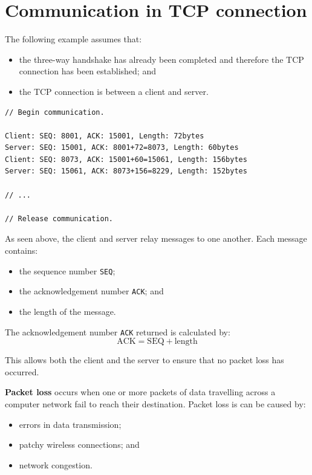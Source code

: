 \documentclass[a4paper]{systems-software}
\begin{document}
\section{Communication in TCP connection}

The following example assumes that:
\begin{itemize}
	\item the three-way handshake has already been completed and therefore the TCP connection has been established; and
	\item the TCP connection is between a client and server.
\end{itemize}

\begin{lstlisting}[title={Example TCP communication between a client and server.}]
// Begin communication.

Client: SEQ: 8001, ACK: 15001, Length: 72bytes
Server: SEQ: 15001, ACK: 8001+72=8073, Length: 60bytes
Client: SEQ: 8073, ACK: 15001+60=15061, Length: 156bytes
Server: SEQ: 15061, ACK: 8073+156=8229, Length: 152bytes

// ...

// Release communication.
\end{lstlisting}

As seen above, the client and server relay messages to one another. Each message contains:
\begin{itemize}
	\item the sequence number \texttt{SEQ};
	\item the acknowledgement number \texttt{ACK}; and
	\item the length of the message.	
\end{itemize}

The acknowledgement number \texttt{ACK} returned is calculated by:
\begin{equation*}
\text{ACK} = \text{SEQ} + \text{length}
\end{equation*}

This allows both the client and the server to ensure that no packet loss has occurred.

\textbf{Packet loss} occurs when one or more packets of data travelling across a computer network fail to reach their destination. Packet loss is can be caused by:
\begin{itemize}
	\item errors in data transmission;
	\item patchy wireless connections; and
	\item network congestion.
\end{itemize}
\end{document}
